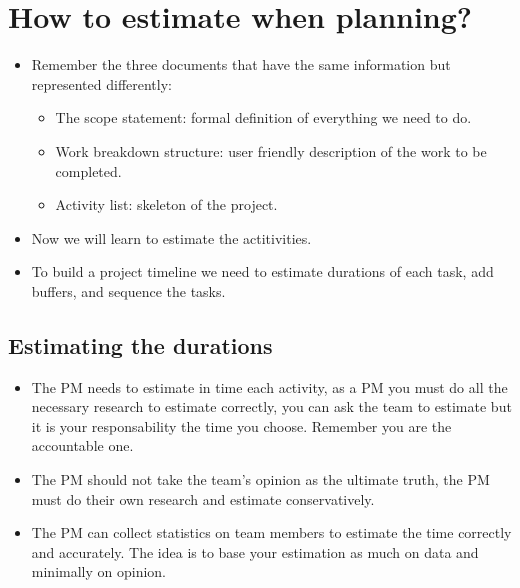 \section{How to estimate when planning?}
\begin{itemize}
    \item Remember the three documents that have the same information but represented differently:
        \begin{itemize}
            \item The scope statement: formal definition of everything we need to do.
            \item Work breakdown structure: user friendly description of the work to be completed.
            \item Activity list: skeleton of the project.
        \end{itemize}
    
    \item Now we will learn to estimate the actitivities. 
    \item To build a project timeline we need to estimate durations of each task, add buffers, and sequence the tasks.
\end{itemize}

\subsection{Estimating the durations}
\begin{itemize}
    \item The PM needs to estimate in time each activity, as a PM you must do all the necessary research to estimate correctly, you can ask the team to estimate but it is your responsability the time you choose. Remember you are the accountable one.
    \item The PM should not take the team's opinion as the ultimate truth, the PM must do their own research and estimate conservatively.
    \item The PM can collect statistics on team members to estimate the time correctly and accurately. The idea is to base your estimation as much on data and minimally on opinion.
\end{itemize}


